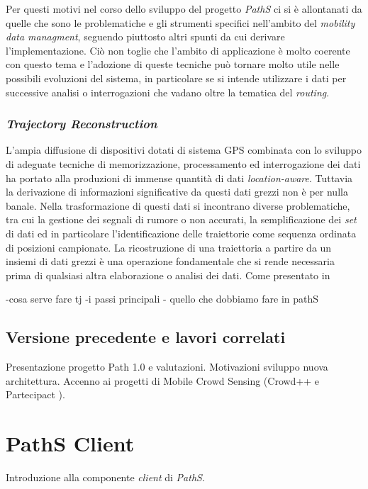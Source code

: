\documentclass[a4paper, 12pt, twoside, openright]{book}
\begin{document}
Per questi motivi nel corso dello sviluppo del progetto \emph{PathS} ci si è allontanati da quelle che sono le problematiche e gli strumenti specifici nell'ambito del \emph{mobility data managment}, seguendo piuttosto altri spunti da cui derivare l'implementazione. Ciò non toglie che l'ambito di applicazione è molto coerente con questo tema e l'adozione di queste tecniche può tornare molto utile nelle possibili evoluzioni del sistema, in particolare se si intende utilizzare i dati per successive analisi o interrogazioni che vadano oltre la tematica del \emph{routing}.

\subsection{\emph{Trajectory Reconstruction}}
L'ampia diffusione di dispositivi dotati di sistema GPS combinata con lo sviluppo di adeguate tecniche di memorizzazione, processamento ed interrogazione dei dati ha portato alla produzioni di immense quantità di dati \emph{location-aware}. Tuttavia la derivazione di informazioni significative da questi dati grezzi non è per nulla banale. Nella trasformazione di questi dati si incontrano diverse problematiche, tra cui la gestione dei segnali di rumore o non accurati, la semplificazione dei \emph{set} di dati ed in particolare l'identificazione delle traiettorie come sequenza ordinata di posizioni campionate.
La ricostruzione di una traiettoria a partire da un insiemi di dati grezzi è una operazione fondamentale che si rende necessaria prima di qualsiasi altra elaborazione o analisi dei dati.
Come presentato in \cite[capitolo~3.1]{mdme}

-cosa serve fare tj
-i passi principali
- quello che dobbiamo fare in pathS


\section{Versione precedente e lavori correlati}
Presentazione progetto Path 1.0 e valutazioni. Motivazioni sviluppo nuova architettura. 
Accenno ai progetti di Mobile Crowd Sensing (Crowd++ \cite{crowdplusplus} e Partecipact \cite{participact}).

\chapter{PathS Client} %
\thispagestyle{empty}

Introduzione alla componente \emph{client} di \emph{PathS}. 
\end{document}
